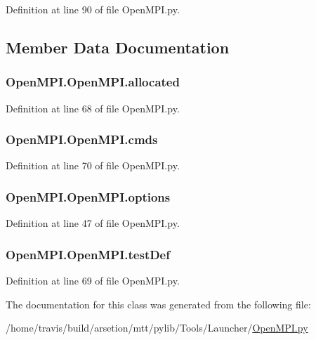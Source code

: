 Definition at line 90 of file Open\-M\-P\-I.\-py.



\subsection{Member Data Documentation}
\hypertarget{classOpenMPI_1_1OpenMPI_a9ffab4795264fde34d136269026204db}{
\subsubsection[{allocated}]{\setlength{\rightskip}{0pt plus 5cm}Open\-M\-P\-I.\-Open\-M\-P\-I.\-allocated}}\label{classOpenMPI_1_1OpenMPI_a9ffab4795264fde34d136269026204db}


Definition at line 68 of file Open\-M\-P\-I.\-py.

\hypertarget{classOpenMPI_1_1OpenMPI_a86be93bbc775c81263813274a8564efc}{
\subsubsection[{cmds}]{\setlength{\rightskip}{0pt plus 5cm}Open\-M\-P\-I.\-Open\-M\-P\-I.\-cmds}}\label{classOpenMPI_1_1OpenMPI_a86be93bbc775c81263813274a8564efc}


Definition at line 70 of file Open\-M\-P\-I.\-py.

\hypertarget{classOpenMPI_1_1OpenMPI_a4a263774614f0b83a63a26639b46b2f5}{
\subsubsection[{options}]{\setlength{\rightskip}{0pt plus 5cm}Open\-M\-P\-I.\-Open\-M\-P\-I.\-options}}\label{classOpenMPI_1_1OpenMPI_a4a263774614f0b83a63a26639b46b2f5}


Definition at line 47 of file Open\-M\-P\-I.\-py.

\hypertarget{classOpenMPI_1_1OpenMPI_acd20b78013350c2363484589ef85b67c}{
\subsubsection[{test\-Def}]{\setlength{\rightskip}{0pt plus 5cm}Open\-M\-P\-I.\-Open\-M\-P\-I.\-test\-Def}}\label{classOpenMPI_1_1OpenMPI_acd20b78013350c2363484589ef85b67c}


Definition at line 69 of file Open\-M\-P\-I.\-py.



The documentation for this class was generated from the following file\-:\begin{DoxyCompactItemize}
\item 
/home/travis/build/arsetion/mtt/pylib/\-Tools/\-Launcher/\hyperlink{OpenMPI_8py}{Open\-M\-P\-I.\-py}\end{DoxyCompactItemize}
